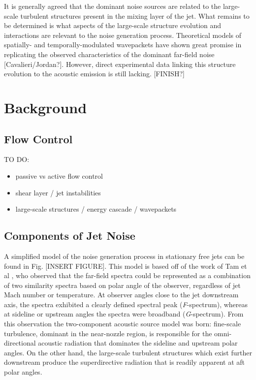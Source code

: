 It is generally agreed that the dominant noise sources are related to the large-scale turbulent structures present in the mixing layer of the jet. 
What remains to be determined is what aspects of the large-scale structure evolution and interactions are relevant to the noise generation process. 
Theoretical models of spatially- and temporally-modulated wavepackets have shown great promise in replicating the observed characteristics of the dominant far-field noise [Cavalieri/Jordan?]. 
However, direct experimental data linking this structure evolution to the acoustic emission is still lacking. 
[FINISH?]
	
\section{Background}
\subsection{Flow Control}
TO DO:
	\begin{itemize}
		\item passive vs active flow control
		\item shear layer / jet instabilities
		\item large-scale structures / energy cascade / wavepackets
	\end{itemize}
\subsection{Components of Jet Noise}
A simplified model of the noise generation process in stationary free jets can be found in Fig. [INSERT FIGURE]. 
This model is based off of the work of Tam et al \citep{Tam1996, Tam2008}, who observed that the far-field spectra could be represented as a combination of two similarity spectra based on polar angle of the observer, regardless of jet Mach number or temperature.
At observer angles close to the jet downstream axis, the spectra exhibited a clearly defined spectral peak (\emph{F}-spectrum), whereas at sideline or upstream angles the spectra were broadband (\emph{G}-spectrum).
From this observation the two-component acoustic source model was born: fine-scale turbulence, dominant in the near-nozzle region, is responsible for the omni-directional acoustic radiation that dominates the sideline and upstream polar angles. On the other hand, the large-scale turbulent structures which exist further downstream produce the superdirective radiation that is readily apparent at aft polar angles. 
 
